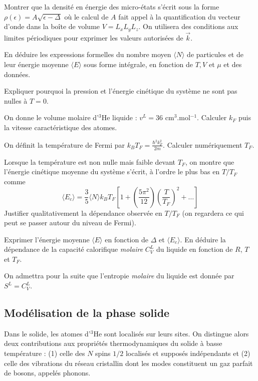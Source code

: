 \documentclass[utf8, 11pt]{feuille}
\begin{document}
\question
Montrer que la densité en énergie des micro-états s'écrit sous la forme $\rho (\epsilon)=A \sqrt{\epsilon-\Delta}$ où le calcul de $A$ fait appel à la quantification du vecteur d'onde dans la boîte de volume $V=L_xL_yL_z$. On utilisera des conditions aux limites périodiques pour exprimer les valeurs autorisées de $\vec{k}$.

\question
En déduire les expressions formelles du nombre moyen $\langle N \rangle$ de particules et de leur énergie moyenne $\langle E \rangle$ sous forme intégrale, en fonction de $T, V$ et $\mu$ et des données.


\question
Expliquer pourquoi la pression et l'énergie cinétique du système ne sont pas nulles à $T = 0$.

\question
On donne le volume molaire d'$^3$He liquide : $v^L = 36$ cm$^3$.mol$^{-1}$. Calculer $k_F$ puis la vitesse caractéristique des atomes.

\question
On définit la température de Fermi par $k_BT_F =\frac{\hbar^2 k_F^2}{2m}$. Calculer numériquement $T_F$.
 
\question
Lorsque la température est non nulle mais faible devant  $T_F$, on montre que l'énergie cinétique moyenne du système s'écrit, à l'ordre le plus bas en $T/T_F$ comme
$$
\langle E_c \rangle=\frac{3}{5}\langle N \rangle k_B T_F \left[1+\left(\frac{5\pi^2}{12}\right) \left(\frac{T}{T_F}\right)^2+\ldots\right]
$$
Justifier qualitativement la dépendance observée en $T/T_F$ (on regardera ce qui peut se passer autour du niveau de Fermi).

\question
Exprimer l'énergie moyenne $\langle E \rangle$ en fonction de $\Delta$ et $\langle E_c \rangle$. En déduire la dépendance
de la capacité calorifique \textit{molaire} $C_V^L$ du liquide en fonction de $R$, $T$ et $T_F$.

On admettra pour la suite  que l'entropie \textit{molaire} du liquide est donnée par $S^L =C_V^L$.

\subsection*{Modélisation de la phase solide}

Dans le solide, les atomes d'$^3$He sont localisés sur leurs sites. On distingue alors deux
contributions aux propriétés thermodynamiques du solide à basse température : (1) celle
des $N$ spins $1/2$ localisés et supposés indépendants et (2) celle des vibrations du réseau
cristallin dont les modes constituent un gaz parfait de bosons, appelés \og phonons\fg.
\end{document}
